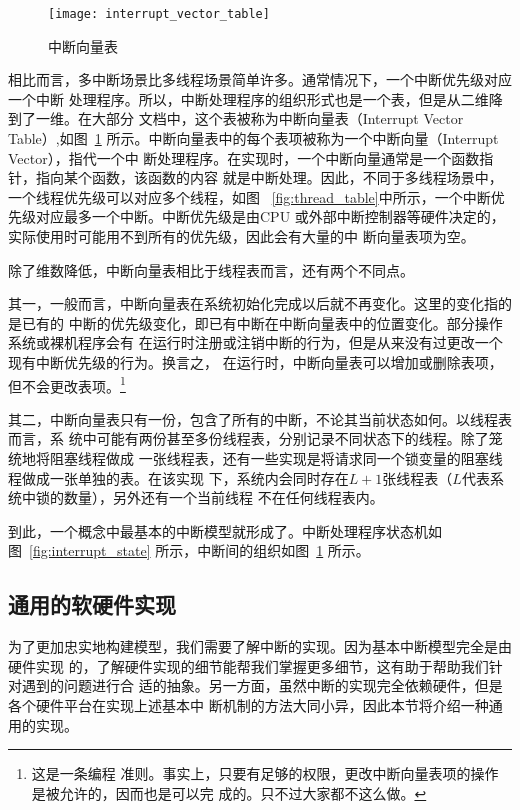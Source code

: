 \begin{figure}[H]
	\centering
	\texttt{[image: interrupt\_vector\_table]}
	\caption{中断向量表}
	\label{fig:interrupt_vector_table}
\end{figure}

相比而言，多中断场景比多线程场景简单许多。通常情况下，一个中断优先级对应一个中断
处理程序。所以，中断处理程序的组织形式也是一个表，但是从二维降到了一维。在大部分
文档中，这个表被称为中断向量表（Interrupt Vector Table）,如图~\ref{fig:interrupt_vector_table} 
所示。中断向量表中的每个表项被称为一个中断向量（Interrupt Vector），指代一个中
断处理程序。在实现时，一个中断向量通常是一个函数指针，指向某个函数，该函数的内容
就是中断处理。因此，不同于多线程场景中，一个线程优先级可以对应多个线程，如图~
\ref{fig:thread_table}中所示，一个中断优先级对应最多一个中断。中断优先级是由CPU
或外部中断控制器等硬件决定的，实际使用时可能用不到所有的优先级，因此会有大量的中
断向量表项为空。

除了维数降低，中断向量表相比于线程表而言，还有两个不同点。

其一，一般而言，中断向量表在系统初始化完成以后就不再变化。这里的变化指的是已有的
中断的优先级变化，即已有中断在中断向量表中的位置变化。部分操作系统或裸机程序会有
在运行时注册或注销中断的行为，但是从来没有过更改一个现有中断优先级的行为。换言之，
在运行时，中断向量表可以增加或删除表项，但不会更改表项。\footnote{这是一条编程
准则。事实上，只要有足够的权限，更改中断向量表项的操作是被允许的，因而也是可以完
成的。只不过大家都不这么做。}

其二，中断向量表只有一份，包含了所有的中断，不论其当前状态如何。以线程表而言，系
统中可能有两份甚至多份线程表，分别记录不同状态下的线程。除了笼统地将阻塞线程做成
一张线程表，还有一些实现是将请求同一个锁变量的阻塞线程做成一张单独的表。在该实现
下，系统内会同时存在$L+1$张线程表（$L$代表系统中锁的数量），另外还有一个当前线程
不在任何线程表内。

到此，一个概念中最基本的中断模型就形成了。中断处理程序状态机如图~\ref{fig:interrupt_state} 
所示，中断间的组织如图~\ref{fig:interrupt_vector_table} 所示。

\subsection{通用的软硬件实现}
\label{subsec:basic_hardware}

为了更加忠实地构建模型，我们需要了解中断的实现。因为基本中断模型完全是由硬件实现
的，了解硬件实现的细节能帮我们掌握更多细节，这有助于帮助我们针对遇到的问题进行合
适的抽象。另一方面，虽然中断的实现完全依赖硬件，但是各个硬件平台在实现上述基本中
断机制的方法大同小异，因此本节将介绍一种通用的实现。

